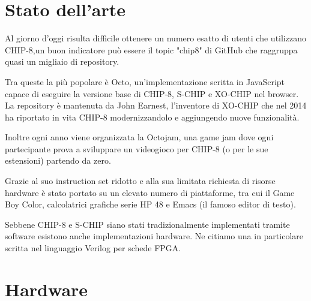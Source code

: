 \documentclass[a4paper]{article}
\begin{document}
\section{Stato dell'arte}

Al giorno d'oggi risulta difficile ottenere un numero esatto di utenti che
utilizzano CHIP-8,un buon indicatore può essere il topic "chip8" di GitHub
che raggruppa quasi un migliaio di repository.

Tra queste la più popolare è Octo, un'implementazione scritta in JavaScript
capace di eseguire la versione base di CHIP-8, S-CHIP e XO-CHIP nel browser.
La repository è mantenuta da John Earnest, l'inventore di XO-CHIP che nel 2014
ha riportato in vita CHIP-8 modernizzandolo e aggiungendo nuove funzionalità.

Inoltre ogni anno viene organizzata la Octojam, una game jam dove ogni partecipante
prova a sviluppare un videogioco per CHIP-8 (o per le sue estensioni) partendo da zero.

Grazie al suo instruction set ridotto e alla sua limitata richiesta di risorse hardware
è stato portato su un elevato numero di piattaforme, tra cui il Game Boy Color, calcolatrici
grafiche serie HP 48 e Emacs (il famoso editor di testo).

Sebbene CHIP-8 e S-CHIP siano stati tradizionalmente implementati tramite software
esistono anche implementazioni hardware. Ne citiamo una in particolare scritta nel
linguaggio Verilog per schede FPGA.

\clearpage

\section{Hardware}\label{sec:hardware}
\end{document}
